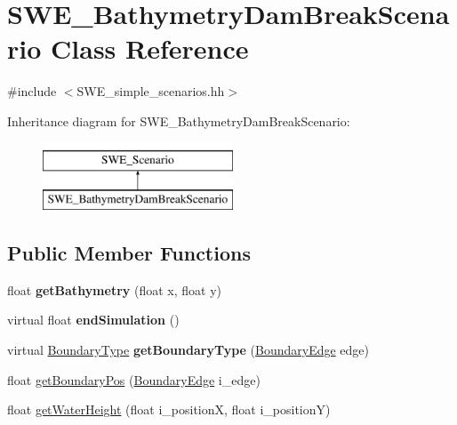 \hypertarget{classSWE__BathymetryDamBreakScenario}{\section{S\-W\-E\-\_\-\-Bathymetry\-Dam\-Break\-Scenario Class Reference}
\label{classSWE__BathymetryDamBreakScenario}
}


{\ttfamily \#include $<$S\-W\-E\-\_\-simple\-\_\-scenarios.\-hh$>$}

Inheritance diagram for S\-W\-E\-\_\-\-Bathymetry\-Dam\-Break\-Scenario\-:\begin{figure}[H]
\begin{center}
\leavevmode
\includegraphics[height=2.000000cm]{classSWE__BathymetryDamBreakScenario}
\end{center}
\end{figure}
\subsection*{Public Member Functions}
\begin{DoxyCompactItemize}
\item 
\hypertarget{classSWE__BathymetryDamBreakScenario_abbc8b6d317163f21d2e9d46f67a6465f}{float {\bfseries get\-Bathymetry} (float x, float y)}\label{classSWE__BathymetryDamBreakScenario_abbc8b6d317163f21d2e9d46f67a6465f}

\item 
\hypertarget{classSWE__BathymetryDamBreakScenario_a29a5d3d82ad7092504b79a263c766feb}{virtual float {\bfseries end\-Simulation} ()}\label{classSWE__BathymetryDamBreakScenario_a29a5d3d82ad7092504b79a263c766feb}

\item 
\hypertarget{classSWE__BathymetryDamBreakScenario_ac7a07d56d659238c0dc099c6251e265b}{virtual \hyperlink{SWE__Scenario_8hh_af75d5dd7322fa39ed0af4e7839e600f8}{Boundary\-Type} {\bfseries get\-Boundary\-Type} (\hyperlink{SWE__Scenario_8hh_aa5e01e3f7df312f7b9b0d02521141fcc}{Boundary\-Edge} edge)}\label{classSWE__BathymetryDamBreakScenario_ac7a07d56d659238c0dc099c6251e265b}

\item 
float \hyperlink{classSWE__BathymetryDamBreakScenario_aa861ba2d4d7e71509f78e1d4d4cb82c7}{get\-Boundary\-Pos} (\hyperlink{SWE__Scenario_8hh_aa5e01e3f7df312f7b9b0d02521141fcc}{Boundary\-Edge} i\-\_\-edge)
\item 
float \hyperlink{classSWE__BathymetryDamBreakScenario_aa903538480526b092fff75160d7e225c}{get\-Water\-Height} (float i\-\_\-position\-X, float i\-\_\-position\-Y)
\end{DoxyCompactItemize}


